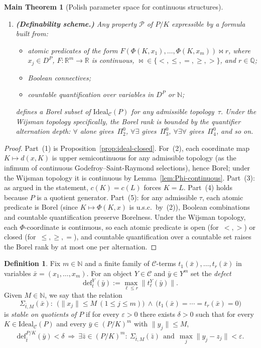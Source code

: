 \documentclass[12pt,fleqn,a4paper]{amsart}
\renewcommand{\le}{\leqslant}
\renewcommand{\ge}{\geqslant}
\numberwithin{equation}{section}
\newtheorem{mainthm}[theorem]{Main Theorem}
\theoremstyle{definition}
\newtheorem{definition}[theorem]{Definition}
\newcommand{\N}{\mathbb{N}}
\newcommand{\Q}{\mathbb{Q}}
\newcommand{\R}{\mathbb{R}}
\newcommand{\Ideal}{\mathrm{Ideal}}
\begin{document}
\begin{mainthm}[Polish parameter space for continuous structures]
\begin{enumerate}
\item \textbf{(Definability scheme.)}
Any property $\mathcal P$ of $P/K$ expressible by a formula built from:
\begin{itemize}
\item atomic predicates of the form
$F(\Phi(K,x_1),\ldots,\Phi(K,x_m))\bowtie r$,
where $x_j\in D^P$, $F:\R^m\to\R$ is continuous,
$\bowtie\in\{<,\le,=,\ge,>\}$, and $r\in\Q$;
\item Boolean connectives;
\item countable quantification over variables in $D^P$ or $\N$;
\end{itemize}
defines a Borel subset of $\Ideal_{\mathcal C}(P)$ for \emph{any} admissible
topology~$\tau$.  Under the \emph{Wijsman} topology specifically,
the Borel rank is bounded by the quantifier alternation depth:
$\forall$ alone gives~$\Pi^0_2$,
$\forall\exists$ gives~$\Pi^0_3$,
$\forall\exists\forall$ gives~$\Pi^0_4$, and so on.
\end{enumerate}
\end{mainthm}

\begin{proof}
Part~(1) is Proposition~\ref{prop:ideal-closed}.
For~(2), each coordinate map $K\mapsto d(x,K)$ is upper semicontinuous for any
admissible topology (as the infimum of continuous Godefroy--Saint-Raymond selections),
hence Borel; under the Wijsman topology it is continuous by
Lemma~\ref{lem:Phi-continuous}.
Part~(3): as argued in the statement, $c(K)=c(L)$ forces $K=L$.
Part~(4) holds because $P$ is a quotient generator.
Part~(5): for any admissible $\tau$, each atomic predicate is Borel
(since $K\mapsto\Phi(K,x)$ is u.s.c.\ by~(2)),
Boolean combinations and countable quantification preserve Borelness.
Under the Wijsman topology, each $\Phi$-coordinate is continuous,
so each atomic predicate is open (for~$<,>$)
or closed (for~$\le,\ge,=$), and countable
quantification over a countable set raises the Borel rank by at most one per alternation.
\end{proof}

\begin{definition}\label{def:stable-rel}
Fix $m\in\N$ and a finite family of $\mathcal C$-terms
$t_1(\bar x),\dots,t_r(\bar x)$ in variables $\bar x=(x_1,\dots,x_m)$.
For an object $Y\in\mathcal C$ and $\bar y\in Y^m$ set the \emph{defect}
\[
\mathrm{def}_{\bar t}^Y(\bar y):=\max_{\ell\le r}\|t_\ell^Y(\bar y)\|.
\]
Given $M\in\N$, we say that the relation
\[
\Sigma_{\bar t,M}(\bar x):\ \ \bigl(\|x_j\|\le M\ (1\le j\le m)\bigr)\ \wedge\
\bigl(t_1(\bar x)=\cdots=t_r(\bar x)=0\bigr)
\]
is \emph{stable on quotients of $P$} if for every $\varepsilon>0$ there exists
$\delta>0$ such that for every $K\in\Ideal_{\mathcal C}(P)$ and every
$\bar y\in (P/K)^m$ with $\|y_j\|\le M$,
\[
\mathrm{def}_{\bar t}^{P/K}(\bar y)<\delta\ \Longrightarrow\
\exists\bar z\in(P/K)^m:
\ \Sigma_{\bar t,M}(\bar z)\ \ \text{and}\ \
\max_j\|y_j-z_j\|<\varepsilon.
\]
\end{definition}
\end{document}
